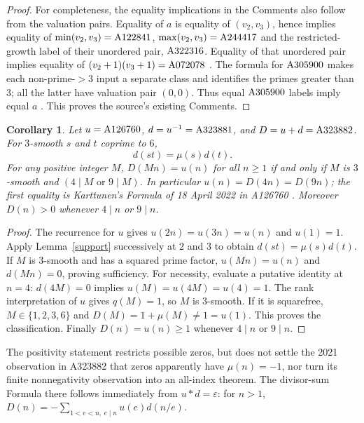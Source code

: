 \documentclass[11pt]{article}
\newtheorem{corollary}[theorem]{Corollary}
\newcommand{\A}[1]{\textnormal{A#1}}
\begin{document}
\begin{proof}
For completeness, the equality implications in the Comments also follow
from the valuation pairs. Equality of $a$ is equality of
$(v_2,v_3)$, hence implies equality of $\min(v_2,v_3)=\A{122841}$,
$\max(v_2,v_3)=\A{244417}$ and the restricted-growth label of their
unordered pair, $\A{322316}$. Equality of that unordered pair implies
equality of $(v_2+1)(v_3+1)=\A{072078}$ \cite{valuationlinks}.
The formula for $\A{305900}$ makes each non-prime-$>3$ input a separate
class and identifies the primes greater than $3$; all the latter have
valuation pair $(0,0)$. Thus equal $\A{305900}$ labels imply equal $a$
\cite{filter}. This proves the source's existing Comments.
\end{proof}

\begin{corollary}\label{dual}
Let $u=\A{126760}$, $d=u^{-1}=\A{323881}$, and
$D=u+d=\A{323882}$. For $3$-smooth $s$ and $t$ coprime to $6$,
\[
 d(st)=\mu(s)d(t).
\]
For any positive integer $M$, $D(Mn)=u(n)$ for all $n\geq1$
if and only if $M$ is $3$-smooth and $(4\mid M\text{ or }9\mid M)$.
In particular $u(n)=D(4n)=D(9n)$; the first equality is Karttunen's
Formula of 18 April 2022 in A126760 \cite{complement,dualinverse,dualsum}.
Moreover $D(n)>0$ whenever $4\mid n$ or $9\mid n$.
\end{corollary}
\begin{proof}
The recurrence for $u$ gives $u(2n)=u(3n)=u(n)$ and $u(1)=1$.
Apply Lemma~\ref{support} successively at $2$ and $3$ to obtain
$d(st)=\mu(s)d(t)$. If $M$ is $3$-smooth and has a squared prime
factor, $u(Mn)=u(n)$ and $d(Mn)=0$, proving sufficiency.
For necessity, evaluate a putative identity at $n=4$:
$d(4M)=0$ implies $u(M)=u(4M)=u(4)=1$.
The rank interpretation of $u$ gives $q(M)=1$, so $M$ is $3$-smooth.
If it is squarefree, $M\in\{1,2,3,6\}$ and
$D(M)=1+\mu(M)\ne1=u(1)$. This proves the classification.
Finally $D(n)=u(n)\geq1$ whenever $4\mid n$ or $9\mid n$.
\end{proof}

The positivity statement restricts possible zeros, but does not settle the
2021 observation in A323882 that zeros apparently have $\mu(n)=-1$,
nor turn its finite nonnegativity observation into an all-index theorem.
The divisor-sum Formula there follows immediately from
$u*d=\varepsilon$: for $n>1$,
$D(n)=-\sum_{1<e<n,\ e\mid n}u(e)d(n/e)$.
\end{document}
